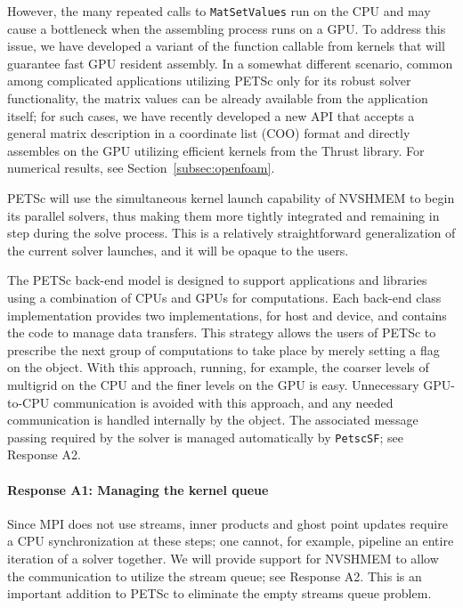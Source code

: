 \documentclass[5p,times]{elsarticle}
\begin{document}
However, the many repeated calls to {\tt MatSetValues} run on the CPU and may
cause a bottleneck when the assembling process runs on a GPU. To address this issue, we
have developed a variant of the function callable from kernels that
will guarantee fast GPU resident assembly. In a somewhat different scenario,
common among complicated applications  utilizing PETSc only for
its robust solver functionality, the matrix values can be already available from
the application itself; for such cases, we have recently developed a new API
that accepts a  general matrix description in a coordinate list (COO) format
and directly assembles on the GPU utilizing efficient kernels from the Thrust
library. %
For numerical results, see Section~\ref{subsec:openfoam}.


PETSc will use the simultaneous kernel launch capability of NVSHMEM
to begin its parallel solvers, thus making them more tightly integrated and remaining in step during
the solve process. This is a relatively straightforward generalization of the current solver
launches, and it will be opaque to the users.

The PETSc back-end model is designed to support applications and libraries
using a combination of CPUs and GPUs for computations. Each back-end class
implementation provides two implementations, for host and device, and contains
the code to manage data transfers. This strategy allows the users of PETSc to prescribe the next group of computations to take place by merely
setting a flag on the object.
With this approach, running, for example, the coarser levels of multigrid on the
CPU and the finer levels on the GPU is easy.
Unnecessary GPU-to-CPU communication is avoided with this approach, and any
needed communication is handled internally by the object. 
The
associated message passing required by the solver is managed automatically by
{\tt PetscSF}; see Response A2.

\paragraph{Response A1: Managing the kernel queue}


Since MPI does not use streams, 
inner products and ghost point updates require a CPU synchronization at these steps;  one cannot, for example, pipeline an entire iteration of a solver together. 
We will provide support for NVSHMEM to allow the communication to utilize the stream queue; see Response A2. This is an important addition to PETSc to eliminate the empty streams queue problem.
\end{document}
